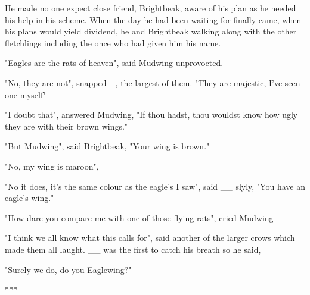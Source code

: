 He made no one expect close friend, Brightbeak, aware of his plan as he needed his help in his scheme. When the day he had been waiting for finally came, when his plans would yield dividend, he and Brightbeak walking along with the other fletchlings including the once who had given him his name.

"Eagles are the rats of heaven", said Mudwing unprovocted.

"No, they are not", snapped _, the largest of them. "They are majestic, I've seen one myself"

"I doubt that", answered Mudwing, "If thou hadst, thou wouldst know how ugly they are with their brown wings."

"But Mudwing", said Brightbeak, "Your wing is brown."

"No, my wing is maroon", 

"No it does, it's the same colour as the eagle's I saw", said __ slyly, "You have an eagle's wing."

"How dare you compare me with one of those flying rats", cried Mudwing

"I think we all know what this calls for", said another of the larger crows which made them all laught. __ was the first to catch his breath so he said,  

"Surely we do, do you Eaglewing?"

***

